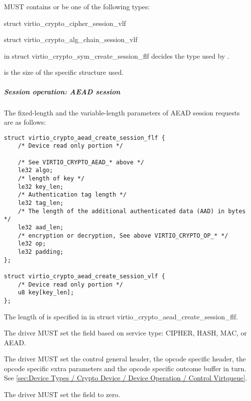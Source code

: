  MUST contains or be one of the following types:
\begin{itemize*}
\item struct virtio_crypto_cipher_session_vlf
\item struct virtio_crypto_alg_chain_session_vlf
\end{itemize*}

 in struct virtio_crypto_sym_create_session_flf decides the
type used by .

 is the size of the specific structure used.


\subparagraph{Session operation: AEAD session}\label{sec:Device Types / Crypto Device / Device
Operation / Control Virtqueue / Session operation / Session operation: AEAD session}

The fixed-length and the variable-length parameters of AEAD session requests are as follows:

\begin{lstlisting}
struct virtio_crypto_aead_create_session_flf {
    /* Device read only portion */

    /* See VIRTIO_CRYPTO_AEAD_* above */
    le32 algo;
    /* length of key */
    le32 key_len;
    /* Authentication tag length */
    le32 tag_len;
    /* The length of the additional authenticated data (AAD) in bytes */
    le32 aad_len;
    /* encryption or decryption, See above VIRTIO_CRYPTO_OP_* */
    le32 op;
    le32 padding;
};

struct virtio_crypto_aead_create_session_vlf {
    /* Device read only portion */
    u8 key[key_len];
};
\end{lstlisting}

The length of  is specified in  in struct
virtio_crypto_aead_create_session_flf.



\begin{itemize*}
\item The driver MUST set the  field based on service type: CIPHER, HASH, MAC, or AEAD.
\item The driver MUST set the control general header, the opcode specific header,
    the opcode specific extra parameters and the opcode specific outcome buffer in turn.
    See \ref{sec:Device Types / Crypto Device / Device Operation / Control Virtqueue}.
\item The driver MUST set the  field to zero.
\end{itemize*}

